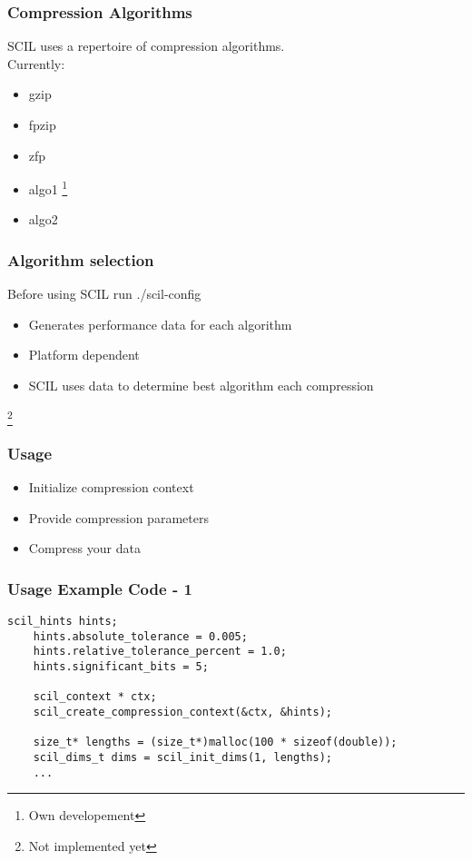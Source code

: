\documentclass[compress]{beamer}
\begin{document}
\begin{frame}
	\frametitle{Compression Algorithms}

	SCIL uses a repertoire of compression algorithms.\\
	Currently:

	\bigskip

	\begin{itemize}
		\item gzip
		\item fpzip
		\item zfp
		\item algo1 \footnote{Own developement}
		\item algo2 \footnotemark[\value{footnote}]
	\end{itemize}

	\setcounter{footnote}{0}
\end{frame}

\begin{frame}
	\frametitle{Algorithm selection}

	Before using SCIL run ./scil-config

	\bigskip

	\begin{itemize}
		\item Generates performance data for each algorithm
		\item Platform dependent
		\item SCIL uses data to determine best algorithm each compression
	\end{itemize}

	\footnote{Not implemented yet}
\end{frame}

\begin{frame}
	\frametitle{Usage}

	\begin{itemize}
		\item Initialize compression context
		\item Provide compression parameters
		\item Compress your data
	\end{itemize}
\end{frame}

\begin{frame}[fragile]
	\frametitle{Usage Example Code - 1}

	\begin{lstlisting}[caption=SCIL usage example]
	scil_hints hints;
	hints.absolute_tolerance = 0.005;
	hints.relative_tolerance_percent = 1.0;
	hints.significant_bits = 5;

	scil_context * ctx;
	scil_create_compression_context(&ctx, &hints);

	size_t* lengths = (size_t*)malloc(100 * sizeof(double));
	scil_dims_t dims = scil_init_dims(1, lengths);
	...
	\end{lstlisting}

\end{frame}
\end{document}
